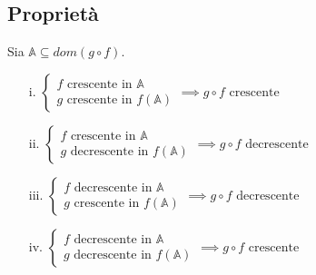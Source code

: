 \subsection{Proprietà}
Sia $\mathbb{A} \subseteq dom(g \circ f)$.
\begin{enumerate}
\item[i.] $\begin{cases}
f \text{ crescente in } \mathbb{A}\\
g \text{ crescente in } f(\mathbb{A})
\end{cases} \implies g \circ f \text{ crescente}$
\item[ii.] $\begin{cases}
f \text{ crescente in } \mathbb{A}\\
g \text{ decrescente in } f(\mathbb{A})
\end{cases} \implies g \circ f \text{ decrescente}$
\item[iii.] $\begin{cases}
f \text{ decrescente in } \mathbb{A}\\
g \text{ crescente in } f(\mathbb{A})
\end{cases} \implies g \circ f \text{ decrescente}$
\item[iv.] $\begin{cases}
f \text{ decrescente in } \mathbb{A}\\
g \text{ decrescente in } f(\mathbb{A})
\end{cases} \implies g \circ f \text{ crescente}$
\end{enumerate} 